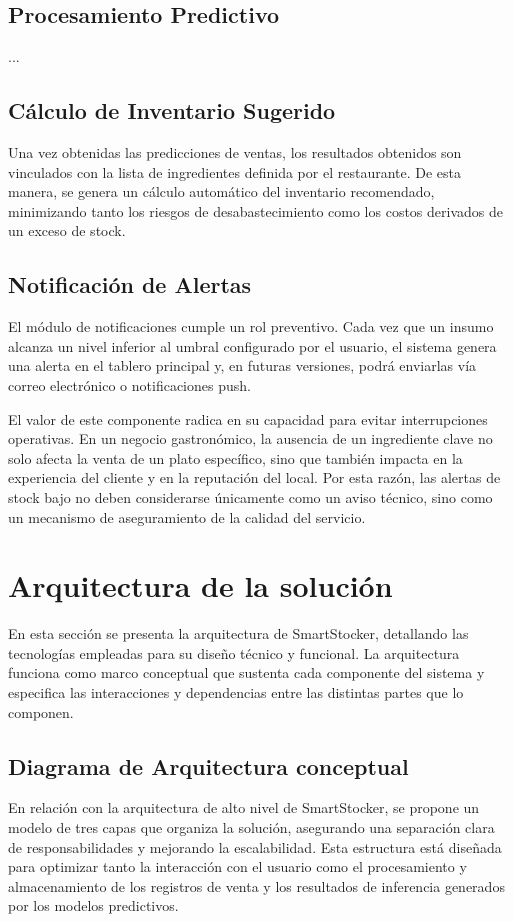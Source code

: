 \subsection{Procesamiento Predictivo}\label{sec:procesamiento-predictivo}

...
\subsection{Cálculo de Inventario Sugerido}\label{sec:calculo-inventario}

Una vez obtenidas las predicciones de ventas, los resultados obtenidos son vinculados con la lista de ingredientes definida por el restaurante. De esta manera, se genera un cálculo automático del inventario recomendado, minimizando tanto los riesgos de desabastecimiento como los costos derivados de un exceso de stock. 

\subsection{Notificación de Alertas}\label{sec:alertas}

El módulo de notificaciones cumple un rol preventivo. Cada vez que un insumo alcanza un nivel inferior al umbral configurado por el usuario, el sistema genera una alerta en el tablero principal y, en futuras versiones, podrá enviarlas vía correo electrónico o notificaciones push.

El valor de este componente radica en su capacidad para evitar interrupciones operativas. En un negocio gastronómico, la ausencia de un ingrediente clave no solo afecta la venta de un plato específico, sino que también impacta en la experiencia del cliente y en la reputación del local. Por esta razón, las alertas de stock bajo no deben considerarse únicamente como un aviso técnico, sino como un mecanismo de aseguramiento de la calidad del servicio.


\section{Arquitectura de la solución}\label{sec:arquitectura-solucion}
En esta sección se presenta la arquitectura de SmartStocker, detallando las tecnologías empleadas para su diseño técnico y funcional. La arquitectura funciona como marco conceptual que sustenta cada componente del sistema y especifica las interacciones y dependencias entre las distintas partes que lo componen.

\subsection{Diagrama de Arquitectura conceptual}\label{sec:arquitectura-conceptual}
En relación con la arquitectura de alto nivel de SmartStocker, se propone un modelo de tres capas que organiza la solución, asegurando una separación clara de responsabilidades y mejorando la escalabilidad. Esta estructura está diseñada para optimizar tanto la interacción con el usuario como el procesamiento y almacenamiento de los registros de venta y los resultados de inferencia generados por los modelos predictivos.

